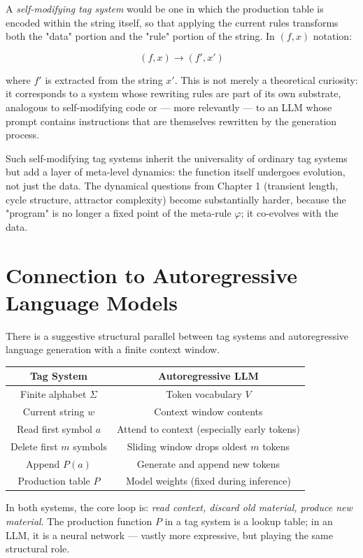 A \textit{self-modifying tag system} would be one in which the production table is encoded within the string itself, so that applying the current rules transforms both the "data" portion and the "rule" portion of the string. In $(f, x)$ notation:

\[(f, x) \to (f', x')\]

where $f'$ is extracted from the string $x'$. This is not merely a theoretical curiosity: it corresponds to a system whose rewriting rules are part of its own substrate, analogous to self-modifying code or --- more relevantly --- to an LLM whose prompt contains instructions that are themselves rewritten by the generation process.

Such self-modifying tag systems inherit the universality of ordinary tag systems but add a layer of meta-level dynamics: the function itself undergoes evolution, not just the data. The dynamical questions from Chapter 1 (transient length, cycle structure, attractor complexity) become substantially harder, because the "program" is no longer a fixed point of the meta-rule $\varphi$; it co-evolves with the data.

\section{Connection to Autoregressive Language Models}

There is a suggestive structural parallel between tag systems and autoregressive language generation with a finite context window.

\begin{center}
\begin{tabular}{cc}
\toprule
Tag System & Autoregressive LLM \\
\midrule
Finite alphabet $\Sigma$ & Token vocabulary $V$ \\
Current string $w$ & Context window contents \\
Read first symbol $a$ & Attend to context (especially early tokens) \\
Delete first $m$ symbols & Sliding window drops oldest $m$ tokens \\
Append $P(a)$ & Generate and append new tokens \\
Production table $P$ & Model weights (fixed during inference) \\
\bottomrule
\end{tabular}
\end{center}

In both systems, the core loop is: \textit{read context, discard old material, produce new material}. The production function $P$ in a tag system is a lookup table; in an LLM, it is a neural network --- vastly more expressive, but playing the same structural role.

